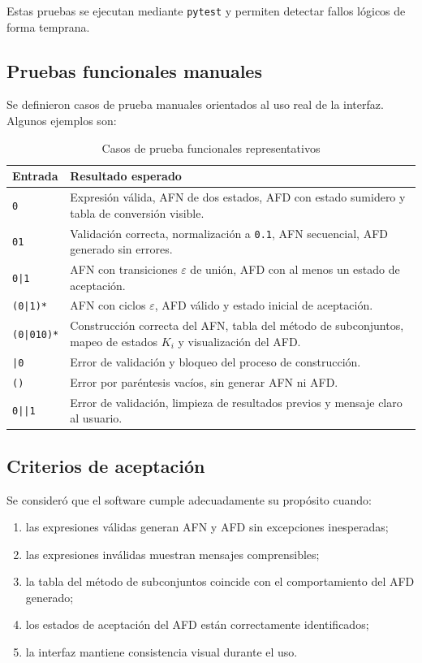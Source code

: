 \documentclass[12pt]{article}
\begin{document}
Estas pruebas se ejecutan mediante \texttt{pytest} y permiten detectar fallos lógicos de forma temprana.

\subsection{Pruebas funcionales manuales}

Se definieron casos de prueba manuales orientados al uso real de la interfaz. Algunos ejemplos son:

\begin{table}[H]
\centering
\caption{Casos de prueba funcionales representativos}
\begin{tabularx}{\textwidth}{>{\RaggedRight\arraybackslash}p{3cm} X}
\toprule
\textbf{Entrada} & \textbf{Resultado esperado} \\
\midrule
\texttt{0} & Expresión válida, AFN de dos estados, AFD con estado sumidero y tabla de conversión visible. \\
\texttt{01} & Validación correcta, normalización a \texttt{0.1}, AFN secuencial, AFD generado sin errores. \\
\texttt{0|1} & AFN con transiciones $\varepsilon$ de unión, AFD con al menos un estado de aceptación. \\
\texttt{(0|1)*} & AFN con ciclos $\varepsilon$, AFD válido y estado inicial de aceptación. \\
\texttt{(0|010)*} & Construcción correcta del AFN, tabla del método de subconjuntos, mapeo de estados $K_i$ y visualización del AFD. \\
\texttt{|0} & Error de validación y bloqueo del proceso de construcción. \\
\texttt{()} & Error por paréntesis vacíos, sin generar AFN ni AFD. \\
\texttt{0||1} & Error de validación, limpieza de resultados previos y mensaje claro al usuario. \\
\bottomrule
\end{tabularx}
\end{table}

\subsection{Criterios de aceptación}

Se consideró que el software cumple adecuadamente su propósito cuando:
\begin{enumerate}[label=\arabic*.]
    \item las expresiones válidas generan AFN y AFD sin excepciones inesperadas;
    \item las expresiones inválidas muestran mensajes comprensibles;
    \item la tabla del método de subconjuntos coincide con el comportamiento del AFD generado;
    \item los estados de aceptación del AFD están correctamente identificados;
    \item la interfaz mantiene consistencia visual durante el uso.
\end{enumerate}
\end{document}
